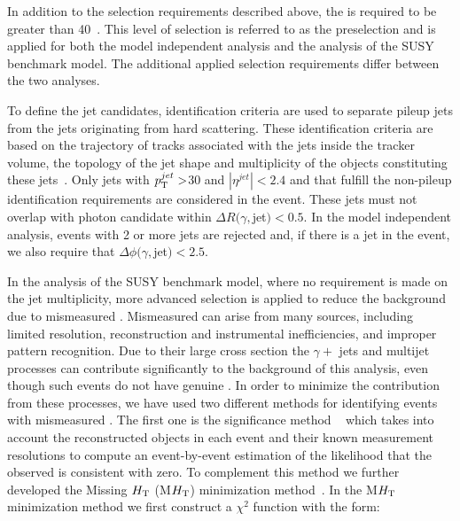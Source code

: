         In addition to the selection requirements described above, the \met is required to be greater than 40~\GeV. This level of selection is referred to as the preselection and is applied for both the model independent analysis and the analysis of the SUSY benchmark model. The additional applied selection requirements differ between the two analyses.
  
        To define the jet candidates, identification criteria are used to separate pileup jets from the jets originating from hard scattering. These identification criteria are based on the trajectory of tracks associated with the jets inside the tracker volume, the topology of the jet shape and multiplicity of the objects constituting these jets~\cite{CMS-PAS-JME-13-005}. Only jets with $p_{\mathrm{T}}^{jet} > $30 \GeV and $|\eta^{jet}| < 2.4$ and that fulfill the non-pileup identification requirements are considered in the event. These jets must not overlap with photon candidate within $\Delta R(\gamma,$jet$) < 0.5$. In the model independent analysis, events with 2 or more jets are rejected and, if there is a jet in the event, we also require that $\Delta \phi(\gamma,$jet$) < 2.5$. 

	    In the analysis of the SUSY benchmark model, where no requirement is made on the jet multiplicity, more advanced selection is applied to reduce the background due to mismeasured \met. Mismeasured \met can arise from many sources, including limited \met resolution, reconstruction and instrumental inefficiencies, and improper pattern recognition. Due to their large cross section the $\gamma + $ jets and multijet processes can contribute significantly to the background of this analysis, even though such events do not have genuine \met. In order to minimize the contribution from these processes, we have used two different methods for identifying events with mismeasured \met. The first one is  the \met significance method ~\cite{Chatrchyan:2011tn} which takes into account the reconstructed objects in each event and their known measurement resolutions to compute an event-by-event estimation of the likelihood that the observed \met is consistent with zero. To complement this method we further developed the Missing $H_{\mathrm{T}}$ (M$H_{\mathrm{T}}$) minimization method~\cite{CMS:2014mea}. In the M$H_{\mathrm{T}}$ minimization method we first construct a $\chi^2$ function with the form:
 
